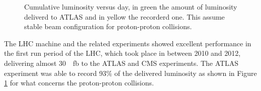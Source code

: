 \begin{figure}
\center
{}\quad
{}
\caption{Cumulative luminosity versus day, in green the amount of luminosity deliverd to ATLAS and in yellow the recorderd one. This assume stable beam configuration for proton-proton collisions.}
\label{pic:atlaslumi}
\end{figure}
The LHC machine and the related experiments showed excellent performance in the first run period of the LHC, which took place in between 2010 and 2012, delivering almost \SI{30}{\per\femto\barn} to the ATLAS and CMS experiments. The ATLAS experiment was able to record 93$\percent$ of the delivered luminosity as shown in Figure \ref{pic:atlaslumi} for what concerns the proton-proton collisions.


